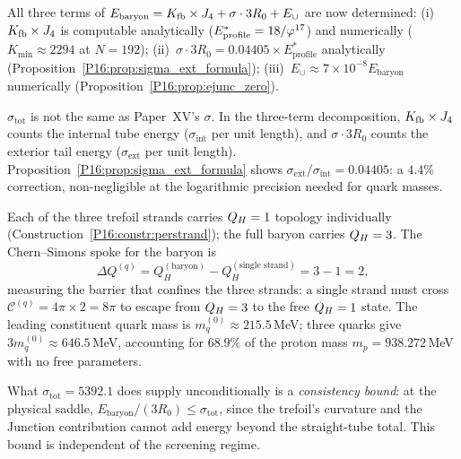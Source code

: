 \begin{remark}
\label{P16:rem:three_flows}
All three terms of $E_{\mathrm{baryon}} = K_{\mathrm{fb}}\times J_4 + \sigma\cdot3R_0
+ E_\cup$ are now determined: (i)~$K_{\mathrm{fb}}\times J_4$ is computable
analytically ($E_{\mathrm{profile}}^*=18/\varphi^{17}$) and numerically
($K_{\min}\approx2294$ at $N=192$); (ii)~$\sigma\cdot3R_0 =
0.04405\times E_{\mathrm{profile}}^*$ analytically
(Proposition~\ref{P16:prop:sigma_ext_formula}); (iii)~$E_\cup\approx
7\times10^{-8}E_{\mathrm{baryon}}$ numerically (Proposition~\ref{P16:prop:ejunc_zero}).
\end{remark}

\begin{remark}
\label{P16:rem:sigma_decomposition}
$\sigma_{\mathrm{tot}}$ is not the same as Paper~XV's $\sigma$.
In the three-term decomposition, $K_{\mathrm{fb}}\times J_4$ counts the internal
tube energy ($\sigma_{\mathrm{int}}$ per unit length), and $\sigma\cdot3R_0$
counts the exterior tail energy ($\sigma_{\mathrm{ext}}$ per unit length).
Proposition~\ref{P16:prop:sigma_ext_formula} shows $\sigma_{\mathrm{ext}}/
\sigma_{\mathrm{int}}=0.04405$: a $4.4\%$ correction, non-negligible at
the logarithmic precision needed for quark masses.
\end{remark}

\begin{remark}
\label{P16:rem:cs_spoke_quark}
Each of the three trefoil strands carries $Q_H=1$ topology individually
(Construction~\ref{P16:constr:perstrand}); the full baryon carries $Q_H=3$.
The Chern--Simons spoke for the baryon is
\begin{equation}
  \Delta Q^{(q)} = Q_H^{(\text{baryon})} - Q_H^{(\text{single strand})}
  = 3 - 1 = 2,
\end{equation}
measuring the barrier that confines the three strands: a single strand
must cross $\mathcal{C}^{(q)}=4\pi\times2=8\pi$ to escape from $Q_H=3$
to the free $Q_H=1$ state. The leading constituent quark mass is
$m_q^{(0)} \approx 215.5$\,MeV; three quarks give
$3m_q^{(0)}\approx646.5$\,MeV, accounting for $68.9\%$ of the proton
mass $m_p=938.272$\,MeV with no free parameters.
\end{remark}

\begin{remark}
\label{P16:rem:consistency_bound}
What $\sigma_{\mathrm{tot}}=5392.1$ does supply unconditionally is a
\emph{consistency bound}: at the physical saddle,
$E_{\mathrm{baryon}}/(3R_0)\leq\sigma_{\mathrm{tot}}$, since the
trefoil's curvature and the Junction contribution cannot add energy
beyond the straight-tube total.  This bound is independent of the
screening regime.
\end{remark}


